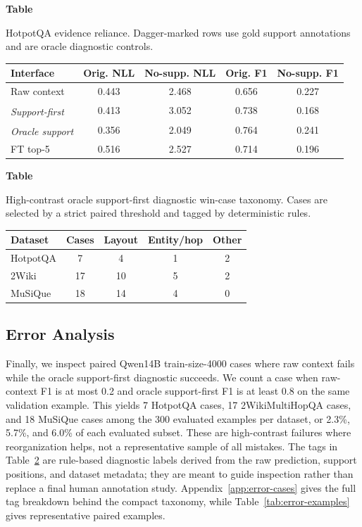 \documentclass[a4paper,fleqn]{cas-sc}
\newcommand{\sidetablecaption}[2]{%
  \refstepcounter{table}\label{#1}%
  \begingroup
  \raggedright\footnotesize
  \textbf{Table~\thetable}\par
  #2\par
  \endgroup
  \vspace{3pt}
}
\newcommand{\diagiface}[1]{\emph{#1}\textsuperscript{\dag}}
\begin{document}
\begin{table}[t]
\centering
\begin{minipage}[t]{0.55\textwidth}
\centering
\sidetablecaption{tab:hotpotqa-reliance}{HotpotQA evidence reliance.
Dagger-marked rows use gold support annotations and are oracle diagnostic
controls.}
\scriptsize
\setlength{\tabcolsep}{2.4pt}
\begin{tabular}{lcccc}
\toprule
Interface & Orig. NLL & No-supp. NLL & Orig. F1 & No-supp. F1 \\
\midrule
Raw context & 0.443 & 2.468 & 0.656 & 0.227 \\
\diagiface{Support-first} & 0.413 & 3.052 & 0.738 & 0.168 \\
\diagiface{Oracle support} & 0.356 & 2.049 & 0.764 & 0.241 \\
FT top-5 & 0.516 & 2.527 & 0.714 & 0.196 \\
\bottomrule
\end{tabular}
\end{minipage}
\hfill
\begin{minipage}[t]{0.42\textwidth}
\centering
\sidetablecaption{tab:error-taxonomy}{High-contrast oracle support-first
diagnostic win-case taxonomy. Cases are selected by a strict paired threshold
and tagged by deterministic rules.}
\scriptsize
\setlength{\tabcolsep}{2.6pt}
\begin{tabular}{lcccc}
\toprule
Dataset & Cases & Layout & Entity/hop & Other \\
\midrule
HotpotQA & 7 & 4 & 1 & 2 \\
2Wiki & 17 & 10 & 5 & 2 \\
MuSiQue & 18 & 14 & 4 & 0 \\
\bottomrule
\end{tabular}
\end{minipage}
\end{table}

\subsection{Error Analysis}

Finally, we inspect paired Qwen14B train-size-4000 cases where raw context
fails while the oracle support-first diagnostic succeeds. We count a case when
raw-context F1 is at most 0.2 and oracle support-first F1 is at least 0.8 on the same
validation example. This yields 7 HotpotQA cases, 17 2WikiMultiHopQA cases, and
18 MuSiQue cases among the 300 evaluated examples per dataset, or 2.3\%,
5.7\%, and 6.0\% of each evaluated subset. These are high-contrast failures
where reorganization helps, not a representative sample of all mistakes. The
tags in Table~\ref{tab:error-taxonomy} are rule-based diagnostic labels derived
from the raw prediction, support positions, and dataset metadata; they are
meant to guide inspection rather than replace a final human annotation study.
Appendix~\ref{app:error-cases} gives the full tag breakdown behind the compact
taxonomy, while Table~\ref{tab:error-examples} gives representative paired
examples.
\end{document}
